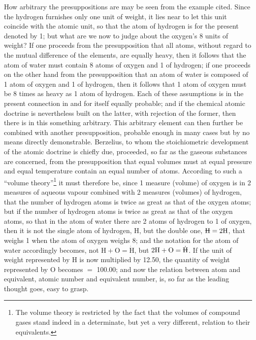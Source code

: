 \documentclass[12pt,a4paper]{book}
\begin{document}
How arbitrary the presuppositions are may be seen from the example cited. Since
the hydrogen furnishes only one unit of weight, it lies near to let this unit
coincide with the atomic unit, so that the atom of hydrogen is for the present
denoted by 1; but what are we now to judge about the oxygen's 8 units of
weight? If one proceeds from the presupposition that all atoms, without regard
to the mutual difference of the elements, are equally heavy, then it follows
that the atom of water must contain 8 atoms of oxygen and 1 of hydrogen; if one
proceeds on the other hand
from the presupposition that an atom of water is composed of 1 atom of oxygen
and 1 of hydrogen, then it follows that 1 atom of oxygen must be 8 times as
heavy as 1 atom of hydrogen. Each of these assumptions is in the present
connection in and for itself equally probable; and if the chemical atomic
doctrine is nevertheless built on the latter, with rejection of the former,
then there is in this something arbitrary. This arbitrary element can then
further be combined with another presupposition, probable enough in many cases
but by no means directly demonstrable. Berzelius, to whom the stoichiometric
development of the atomic doctrine is chiefly due, proceeded, so far as the
gaseous
\setcounter{footnote}{0}
substances are concerned, from the presupposition that equal volumes must at
equal pressure and equal temperature contain an equal number of atoms.
According to such a ``volume theory''\footnote{The volume theory is restricted
by the fact that the volumes of compound gases stand indeed in a determinate,
but yet a very different, relation to their equivalents.} it must therefore be,
since 1 measure (volume) of oxygen is in 2 measures of aqueous vapour combined
with 2 measures (volumes) of hydrogen, that the number of hydrogen atoms is
twice as great as that of the oxygen atoms; but if the number of hydrogen atoms
is twice as great as that of the oxygen atoms, so that in the atom of water
there are 2 atoms of hydrogen to 1 of oxygen, then it is
not the single atom of hydrogen, $\mathrm{H}$, but the double one,
$\rlap{\rule[0.8ex]{0.75em}{0.4pt}}\mathrm{H} = 2\mathrm{H}$,
that weighs 1 when the atom of oxygen weighs 8; and the notation for the atom
of water accordingly becomes, not $\mathrm{H} + \mathrm{O} =
\dot{\mathrm{H}}$, but $2\mathrm{H} + \mathrm{O} =
\dot{\rlap{\rule[0.8ex]{0.75em}{0.4pt}}\mathrm{H}}$.
If the unit of weight represented by $\mathrm{H}$ is now multiplied by 12.50,
the quantity of weight represented by $\mathrm{O}$ becomes $=$ 100.00; and now
the relation between atom and equivalent, atomic number and equivalent number,
is, so far as the leading thought goes, easy to grasp.
\end{document}
